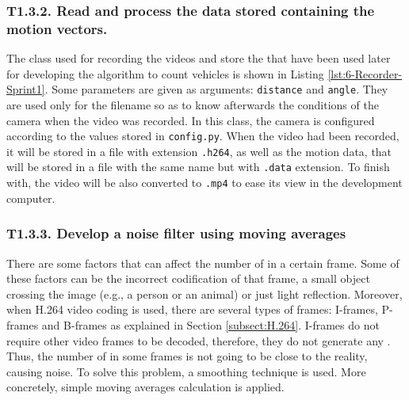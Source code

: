 \subsubsection{T1.3.2. Read and process the data stored containing the motion vectors.}

The class used for recording the videos and store the  that have been used later for developing the algorithm to count vehicles is shown in Listing \ref{lst:6-Recorder-Sprint1}. Some parameters are given as arguments: \texttt{distance} and \texttt{angle}. They are used only for the filename so as to know afterwards the conditions of the camera when the video was recorded. In this class, the camera is configured according to the values stored in \texttt{config.py}. When the video had been recorded, it will be stored in a file with extension \texttt{.h264}, as well as the motion data, that will be stored in a file with the same name but with \texttt{.data} extension. To finish with, the video will be also converted to \texttt{.mp4} to ease its view in the development computer. 




\subsubsection{T1.3.3. Develop a noise filter using moving averages}
There are some factors that can affect the number of  in a certain frame. Some of these factors can be the incorrect codification of that frame, a small object crossing the image (e.g., a person or an animal) or just light reflection. Moreover, when H.264 video coding is used, there are several types of frames: I-frames, P-frames and B-frames as explained in Section \ref{subsect:H.264}. I-frames do not require other video frames to be decoded, therefore, they do not generate any . Thus, the number of  in some frames is not going to be close to the reality, causing noise. To solve this problem, a smoothing technique is used. More concretely, simple moving averages calculation is applied.

